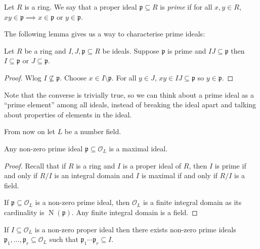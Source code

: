 \documentclass[a4paper]{article}
\renewcommand*{\O}{\mathcal{O}}
\DeclareMathOperator{\n}{N}
\begin{document}
\begin{definition}
  Let \(R\) is a ring. We say that a proper ideal \(\mathfrak p \subseteq R\) is \emph{prime} if for all \(x, y \in R\), \(xy \in \mathfrak p \implies x \in \mathfrak p \text{ or } y \in \mathfrak p\).
\end{definition}

The following lemma gives us a way to characterise prime ideals:
\begin{lemma}
  Let \(R\) be a ring and \(I, J, \mathfrak p \subseteq R\) be ideals. Suppose \(\mathfrak p\) is prime and \(IJ \subseteq \mathfrak{p}\) then \(I \subseteq \mathfrak{p}\) or \(J \subseteq \mathfrak{p}\).
\end{lemma}

\begin{proof}
  Wlog \(I \nsubseteq \mathfrak{p}\). Choose \(x \in I \setminus \mathfrak{p}\). For all \(y \in J\), \(xy \in IJ \subseteq \mathfrak{p}\) so \(y \in \mathfrak{p}\).
\end{proof}

Note that the converse is trivially true, so we can think about a prime ideal as a ``prime element'' among all ideals, instead of breaking the ideal apart and talking about properties of elements in the ideal.

From now on let \(L\) be a number field.

\begin{lemma}
  Any non-zero prime ideal \(\mathfrak{p} \subseteq \O_L\) is a maximal ideal.
\end{lemma}

\begin{proof}
  Recall that if \(R\) is a ring and \(I\) is a proper ideal of \(R\), then \(I\) is prime if and only if \(R/I\) is an integral domain and \(I\) is maximal if and only if \(R/I\) is a field.

  If \(\mathfrak{p} \subseteq \O_L\) is a non-zero prime ideal, then \(\O_L\) is a finite integral domain as its cardinality is \(\n(\mathfrak{p})\). Any finite integral domain is a field.
\end{proof}

\begin{lemma}
  If \(I \subseteq \O_L\) is a non-zero proper ideal then there exists non-zero prime ideals \(\mathfrak{p}_1, \dots, \mathfrak{p}_r \subseteq \O_L\) such that \(\mathfrak{p}_1 \cdots \mathfrak{p}_r \subseteq I\).
\end{lemma}
\end{document}
